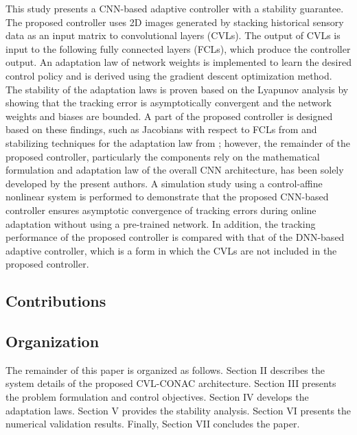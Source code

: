 \documentclass[letterpaper, journal]{IEEEtran}
\begin{document}
This study presents a CNN-based adaptive controller with a stability guarantee.
The proposed controller uses 2D images generated by stacking historical sensory data as an input matrix to convolutional layers (CVLs). The output of CVLs is input to the following fully connected layers (FCLs), which produce the controller output. An adaptation law of network weights is implemented to learn the desired control policy and is derived using the gradient descent optimization method. 
The stability of the adaptation laws is proven based on the Lyapunov analysis by showing that the tracking error is asymptotically convergent and the network weights and biases are bounded. 
A part of the proposed controller is designed based on these findings, such as Jacobians with respect to FCLs from \cite{DixonDNN} and stabilizing techniques for the adaptation law from \cite{BoockEKestimation, BookEKcontrol}; however, the remainder of the proposed controller, particularly the components rely on the mathematical formulation and adaptation law of the overall CNN architecture, has been solely developed by the present authors.
A simulation study using a control-affine nonlinear system is performed to demonstrate that the proposed CNN-based controller ensures asymptotic convergence of tracking errors during online adaptation without using a pre-trained network. 
In addition, the tracking performance of the proposed controller is compared with that of the DNN-based adaptive controller, which is a form in which the CVLs are not included in the proposed controller.


\subsection{Contributions}


\subsection{Organization}
The remainder of this paper is organized as follows. Section II describes the system details of the proposed CVL-CONAC architecture. Section III presents the problem formulation and control objectives. Section IV develops the adaptation laws. Section V provides the stability analysis. Section VI presents the numerical validation results. Finally, Section VII concludes the paper.
\end{document}
